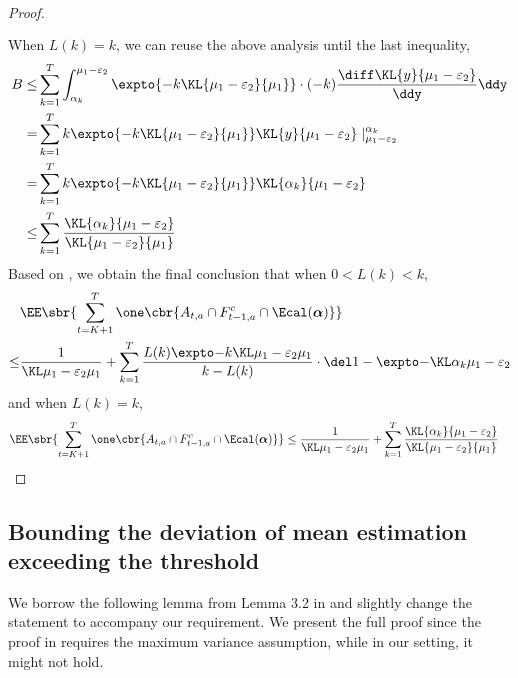 \begin{proof}
\begin{align}
        \\
                \label{eqn:B}
        \end{align}
    When $ L(k) = k$, we can reuse the above analysis until the last inequality,
    \begin{align}
        B
        \leq& 
            \sum_{k=1}^{T}
            \int_{\alpha_k}^{\mu_1 - \varepsilon_2}
                \expto{
                    -k \KL{\mu_1-\varepsilon_2}{\mu_1}
                    } \cdot 
                (-k) \frac{\diff \KL{y}{\mu_1 - \varepsilon_2}}{\ddy} \ddy
                \nonumber
        \\
        =&
            \sum_{k=1}^{T}
            k \expto{-k \KL{\mu_1-\varepsilon_2}{\mu_1}} \KL{y}{\mu_1 - \varepsilon_2} \mid_{\mu_1-\varepsilon_2}^{\alpha_k}
                \nonumber
        \\
        =&
            \sum_{k=1}^{T}
            k \expto{-k \KL{\mu_1-\varepsilon_2}{\mu_1}} \KL{\alpha_k}{\mu_1 - \varepsilon_2}
        \\
        \leq&
            \sum_{k=1}^{T}
            \frac{\KL{\alpha_k}{\mu_1 - \varepsilon_2}}{\KL{\mu_1 - \varepsilon_2}{\mu_1}}
                \label{eqn:B-corner-case}
    \end{align}
        Based on , we obtain the final conclusion that when $0 < L(k) < k$,
        \begin{align*}
            & \EE \sbr{ 
            \sum_{t=K+1}^T
            \one\cbr{ A_{t,a} \cap F_{t-1,a}^c \cap \Ecal(\boldsymbol{\alpha}) }
            }
            \\
            \leq&
            \ExpFThreeOne
        \end{align*}
        and when $L(k) = k$,
        \begin{align*}
            & \EE \sbr{ 
            \sum_{t=K+1}^T
            \one\cbr{ A_{t,a} \cap F_{t-1,a}^c \cap \Ecal(\boldsymbol{\alpha}) }
            }
            \leq
            \ExpFThreeOneA +
            \sum_{k=1}^{T}
            \frac{\KL{\alpha_k}{\mu_1 - \varepsilon_2}}{\KL{\mu_1 - \varepsilon_2}{\mu_1}}
        \end{align*}
    \end{proof}
        
\subsection{Bounding the deviation of mean estimation exceeding the threshold}
    We borrow the following lemma from Lemma 3.2 in \citet{jin2023thompson} and slightly change the statement to accompany our requirement. We present the full proof since the proof in \citet{jin2023thompson} requires the maximum variance assumption, while in our setting, it might not hold.
    
